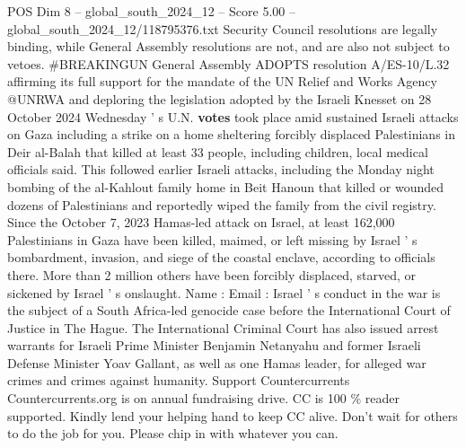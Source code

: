 \begin{textsample}{POS Dim 8 – global\_south\_2024\_12 – Score 5.00 – global\_south\_2024\_12/118795376.txt}
Security Council resolutions are legally binding, while General Assembly resolutions are not, and are also not subject to vetoes. \#BREAKINGUN General Assembly ADOPTS resolution A/ES-10/L.32 affirming its full support for the mandate of the UN Relief and Works Agency @UNRWA and deploring the legislation adopted by the Israeli Knesset on 28 October 2024 Wednesday ' s U.N. \textbf{votes} took place amid sustained Israeli attacks on Gaza including a strike on a home sheltering forcibly displaced Palestinians in Deir al-Balah that killed at least 33 people, including children, local medical officials said.
This followed earlier Israeli attacks, including the Monday night bombing of the al-Kahlout family home in Beit Hanoun that killed or wounded dozens of Palestinians and reportedly wiped the family from the civil registry.
Since the October 7, 2023 Hamas-led attack on Israel, at least 162,000 Palestinians in Gaza have been killed, maimed, or left missing by Israel ' s bombardment, invasion, and siege of the coastal enclave, according to officials there.
More than 2 million others have been forcibly displaced, starved, or sickened by Israel ' s onslaught.
Name : Email : Israel ' s conduct in the war is the subject of a South Africa-led genocide case before the International Court of Justice in The Hague.
The International Criminal Court has also issued arrest warrants for Israeli Prime Minister Benjamin Netanyahu and former Israeli Defense Minister Yoav Gallant, as well as one Hamas leader, for alleged war crimes and crimes against humanity.
Support Countercurrents Countercurrents.org is on annual fundraising drive.
CC is 100 \% reader supported.
Kindly lend your helping hand to keep CC alive.
Don't wait for others to do the job for you.
Please chip in with whatever you can.

\end{textsample}
